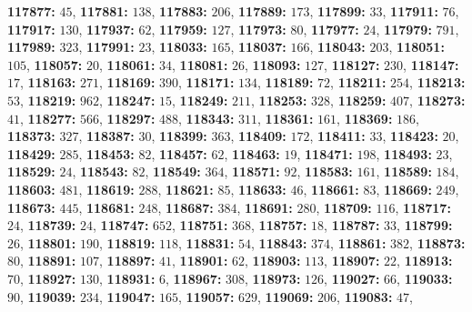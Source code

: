 \textsf{\bfseries 117877:} $45$, \textsf{\bfseries 117881:} $138$, \textsf{\bfseries 117883:} $206$, \textsf{\bfseries 117889:} $173$, \textsf{\bfseries 117899:} $33$, \textsf{\bfseries 117911:} $76$, \textsf{\bfseries 117917:} $130$, \textsf{\bfseries 117937:} $62$, \textsf{\bfseries 117959:} $127$, \textsf{\bfseries 117973:} $80$, \textsf{\bfseries 117977:} $24$, \textsf{\bfseries 117979:} $791$, \textsf{\bfseries 117989:} $323$, \textsf{\bfseries 117991:} $23$, \textsf{\bfseries 118033:} $165$, \textsf{\bfseries 118037:} $166$, \textsf{\bfseries 118043:} $203$, \textsf{\bfseries 118051:} $105$, \textsf{\bfseries 118057:} $20$, \textsf{\bfseries 118061:} $34$, \textsf{\bfseries 118081:} $26$, \textsf{\bfseries 118093:} $127$, \textsf{\bfseries 118127:} $230$, \textsf{\bfseries 118147:} $17$, \textsf{\bfseries 118163:} $271$, \textsf{\bfseries 118169:} $390$, \textsf{\bfseries 118171:} $134$, \textsf{\bfseries 118189:} $72$, \textsf{\bfseries 118211:} $254$, \textsf{\bfseries 118213:} $53$, \textsf{\bfseries 118219:} $962$, \textsf{\bfseries 118247:} $15$, \textsf{\bfseries 118249:} $211$, \textsf{\bfseries 118253:} $328$, \textsf{\bfseries 118259:} $407$, \textsf{\bfseries 118273:} $41$, \textsf{\bfseries 118277:} $566$, \textsf{\bfseries 118297:} $488$, \textsf{\bfseries 118343:} $311$, \textsf{\bfseries 118361:} $161$, \textsf{\bfseries 118369:} $186$, \textsf{\bfseries 118373:} $327$, \textsf{\bfseries 118387:} $30$, \textsf{\bfseries 118399:} $363$, \textsf{\bfseries 118409:} $172$, \textsf{\bfseries 118411:} $33$, \textsf{\bfseries 118423:} $20$, \textsf{\bfseries 118429:} $285$, \textsf{\bfseries 118453:} $82$, \textsf{\bfseries 118457:} $62$, \textsf{\bfseries 118463:} $19$, \textsf{\bfseries 118471:} $198$, \textsf{\bfseries 118493:} $23$, \textsf{\bfseries 118529:} $24$, \textsf{\bfseries 118543:} $82$, \textsf{\bfseries 118549:} $364$, \textsf{\bfseries 118571:} $92$, \textsf{\bfseries 118583:} $161$, \textsf{\bfseries 118589:} $184$, \textsf{\bfseries 118603:} $481$, \textsf{\bfseries 118619:} $288$, \textsf{\bfseries 118621:} $85$, \textsf{\bfseries 118633:} $46$, \textsf{\bfseries 118661:} $83$, \textsf{\bfseries 118669:} $249$, \textsf{\bfseries 118673:} $445$, \textsf{\bfseries 118681:} $248$, \textsf{\bfseries 118687:} $384$, \textsf{\bfseries 118691:} $280$, \textsf{\bfseries 118709:} $116$, \textsf{\bfseries 118717:} $24$, \textsf{\bfseries 118739:} $24$, \textsf{\bfseries 118747:} $652$, \textsf{\bfseries 118751:} $368$, \textsf{\bfseries 118757:} $18$, \textsf{\bfseries 118787:} $33$, \textsf{\bfseries 118799:} $26$, \textsf{\bfseries 118801:} $190$, \textsf{\bfseries 118819:} $118$, \textsf{\bfseries 118831:} $54$, \textsf{\bfseries 118843:} $374$, \textsf{\bfseries 118861:} $382$, \textsf{\bfseries 118873:} $80$, \textsf{\bfseries 118891:} $107$, \textsf{\bfseries 118897:} $41$, \textsf{\bfseries 118901:} $62$, \textsf{\bfseries 118903:} $113$, \textsf{\bfseries 118907:} $22$, \textsf{\bfseries 118913:} $70$, \textsf{\bfseries 118927:} $130$, \textsf{\bfseries 118931:} $6$, \textsf{\bfseries 118967:} $308$, \textsf{\bfseries 118973:} $126$, \textsf{\bfseries 119027:} $66$, \textsf{\bfseries 119033:} $90$, \textsf{\bfseries 119039:} $234$, \textsf{\bfseries 119047:} $165$, \textsf{\bfseries 119057:} $629$, \textsf{\bfseries 119069:} $206$, \textsf{\bfseries 119083:} $47$, 
